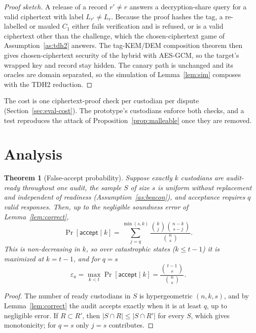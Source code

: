 \documentclass[Crown,sagev]{sagej}
\theoremstyle{plain}
\newtheorem{theorem}{Theorem}
\theoremstyle{definition}
\theoremstyle{remark}
\begin{document}
\begin{proof}[Proof sketch]
A release of a record $r'\neq r$ answers a decryption-share query for a valid ciphertext with label $L_{r'}\neq L_r$. Because the proof hashes the tag, a re-labelled or mauled $C_1$ either fails verification and is refused, or is a valid ciphertext other than the challenge, which the chosen-ciphertext game of Assumption~\ref{as:tdh2} answers. The tag-KEM/DEM composition theorem\cite{abe2008tagkem} then gives chosen-ciphertext security of the hybrid with AES-GCM, so the target's wrapped key and record stay hidden. The canary path is unchanged and its oracles are domain separated, so the simulation of Lemma~\ref{lem:sim} composes with the TDH2 reduction.
\end{proof}

The cost is one ciphertext-proof check per custodian per dispute (Section~\ref{sec:eval-cost}). The prototype's custodians enforce both checks, and a test reproduces the attack of Proposition~\ref{prop:malleable} once they are removed.

\section{Analysis}\label{sec:analysis}

\begin{theorem}[False-accept probability]\label{thm:fa}
Suppose exactly $k$ custodians are audit-ready throughout one audit, the sample $S$ of size $s$ is uniform without replacement and independent of readiness (Assumption~\ref{as:beacon}), and acceptance requires $q$ valid responses. Then, up to the negligible soundness error of Lemma~\ref{lem:correct},
\begin{equation}
\Pr[\mathsf{accept}\mid k]=\sum_{j=q}^{\min(s,k)}\frac{\binom{k}{j}\binom{n-k}{s-j}}{\binom{n}{s}}.
\label{eq:hypergeom}
\end{equation}
This is non-decreasing in $k$, so over catastrophic states ($k\le t-1$) it is maximized at $k=t-1$, and for $q=s$
\begin{equation}
\varepsilon_a=\max_{k<t}\Pr[\mathsf{accept}\mid k]=\frac{\binom{t-1}{s}}{\binom{n}{s}}.
\label{eq:bound}
\end{equation}
\end{theorem}

\begin{proof}
The number of ready custodians in $S$ is hypergeometric $(n,k,s)$, and by Lemma~\ref{lem:correct} the audit accepts exactly when it is at least $q$, up to negligible error. If $R\subset R'$, then $|S\cap R|\le|S\cap R'|$ for every $S$, which gives monotonicity; for $q=s$ only $j=s$ contributes.
\end{proof}
\end{document}

